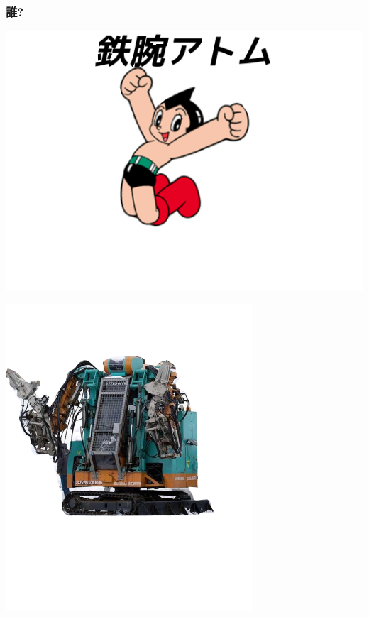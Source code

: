\subsubsection{誰?}
\label{sec-1-1-1}

\begin{container-fluid}
\begin{row-fluid}
\begin{span6}
\includegraphics{img/astro/2.png}
\end{span6}
\begin{span6}
\includegraphics{img/rescue/1.png}
\end{span6}
\end{row-fluid}
\end{container-fluid}

